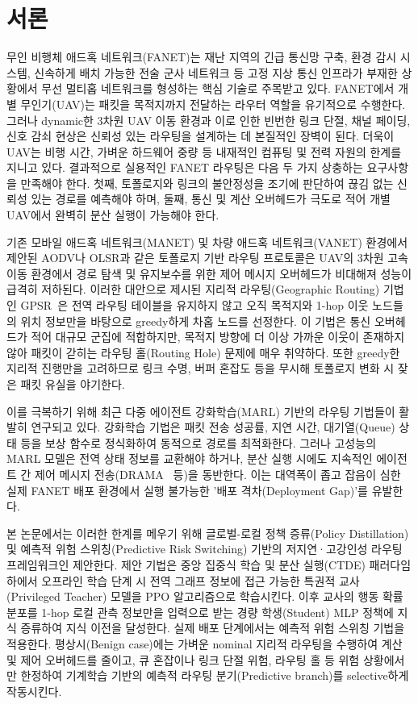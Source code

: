 \section{서론}
\label{sec:서론}

무인 비행체 애드혹 네트워크(FANET)는 재난 지역의 긴급 통신망 구축, 환경 감시 시스템, 신속하게 배치 가능한 전술 군사 네트워크 등 고정 지상 통신 인프라가 부재한 상황에서 무선 멀티홉 네트워크를 형성하는 핵심 기술로 주목받고 있다. FANET에서 개별 무인기(UAV)는 패킷을 목적지까지 전달하는 라우터 역할을 유기적으로 수행한다. 그러나 dynamic한 3차원 UAV 이동 환경과 이로 인한 빈번한 링크 단절, 채널 페이딩, 신호 감쇠 현상은 신뢰성 있는 라우팅을 설계하는 데 본질적인 장벽이 된다. 더욱이 UAV는 비행 시간, 가벼운 하드웨어 중량 등 내재적인 컴퓨팅 및 전력 자원의 한계를 지니고 있다. 결과적으로 실용적인 FANET 라우팅은 다음 두 가지 상충하는 요구사항을 만족해야 한다. 첫째, 토폴로지와 링크의 불안정성을 조기에 판단하여 끊김 없는 신뢰성 있는 경로를 예측해야 하며, 둘째, 통신 및 계산 오버헤드가 극도로 적어 개별 UAV에서 완벽히 분산 실행이 가능해야 한다.

기존 모바일 애드혹 네트워크(MANET) 및 차량 애드혹 네트워크(VANET) 환경에서 제안된 AODV나 OLSR과 같은 토폴로지 기반 라우팅 프로토콜은 UAV의 3차원 고속 이동 환경에서 경로 탐색 및 유지보수를 위한 제어 메시지 오버헤드가 비대해져 성능이 급격히 저하된다. 이러한 대안으로 제시된 지리적 라우팅(Geographic Routing) 기법인 GPSR~\cite{gpsr}은 전역 라우팅 테이블을 유지하지 않고 오직 목적지와 1-hop 이웃 노드들의 위치 정보만을 바탕으로 greedy하게 차홉 노드를 선정한다. 이 기법은 통신 오버헤드가 적어 대규모 군집에 적합하지만, 목적지 방향에 더 이상 가까운 이웃이 존재하지 않아 패킷이 갇히는 라우팅 홀(Routing Hole) 문제에 매우 취약하다. 또한 greedy한 지리적 진행만을 고려하므로 링크 수명, 버퍼 혼잡도 등을 무시해 토폴로지 변화 시 잦은 패킷 유실을 야기한다.

이를 극복하기 위해 최근 다중 에이전트 강화학습(MARL) 기반의 라우팅 기법들이 활발히 연구되고 있다. 강화학습 기법은 패킷 전송 성공률, 지연 시간, 대기열(Queue) 상태 등을 보상 함수로 정식화하여 동적으로 경로를 최적화한다. 그러나 고성능의 MARL 모델은 전역 상태 정보를 교환해야 하거나, 분산 실행 시에도 지속적인 에이전트 간 제어 메시지 전송(DRAMA~\cite{drama} 등)을 동반한다. 이는 대역폭이 좁고 잡음이 심한 실제 FANET 배포 환경에서 실행 불가능한 '배포 격차(Deployment Gap)'를 유발한다.

본 논문에서는 이러한 한계를 메우기 위해 글로벌-로컬 정책 증류(Policy Distillation) 및 예측적 위험 스위칭(Predictive Risk Switching) 기반의 저지연·고강인성 라우팅 프레임워크인  제안한다. 제안 기법은 중앙 집중식 학습 및 분산 실행(CTDE) 패러다임 하에서 오프라인 학습 단계 시 전역 그래프 정보에 접근 가능한 특권적 교사(Privileged Teacher) 모델을 PPO 알고리즘으로 학습시킨다. 이후 교사의 행동 확률 분포를 1-hop 로컬 관측 정보만을 입력으로 받는 경량 학생(Student) MLP 정책에 지식 증류하여 지식 이전을 달성한다. 실제 배포 단계에서는 예측적 위험 스위칭 기법을 적용한다. 평상시(Benign case)에는 가벼운 nominal 지리적 라우팅을 수행하여 계산 및 제어 오버헤드를 줄이고, 큐 혼잡이나 링크 단절 위험, 라우팅 홀 등 위험 상황에서만 한정하여 기계학습 기반의 예측적 라우팅 분기(Predictive branch)를 selective하게 작동시킨다.

